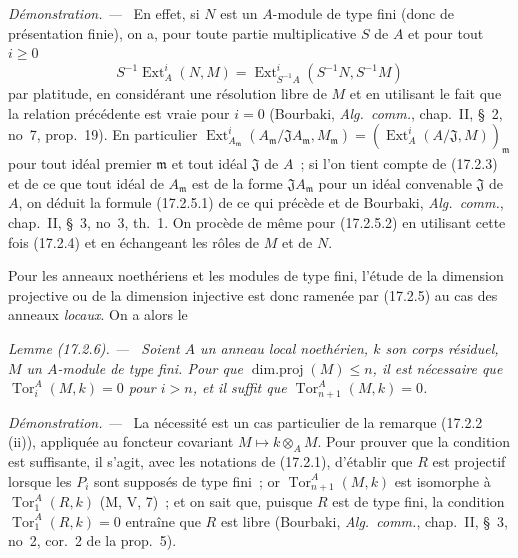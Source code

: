\documentclass[10pt,oneside]{book}
\makeatletter
\newcommand{\setmanualcurrentlabel}[1]{\def\@currentlabel{#1}}
\newcommand{\oldpage}[2][]{%
  \setcounter{footnote}{0}%
  \marginpar{\scriptsize\textbf{#1}~|~#2}\ignorespaces}
\newenvironment{lemma}[1][]{%
  \setmanualcurrentlabel{#1}\par\medskip\noindent\itshape Lemme (#1). ---\ }{\par}
\newenvironment{proof}{%
  \par\medskip\noindent\textit{Démonstration. ---\ }}{\par}
\makeatother
\begin{document}
\begin{proof}
En effet, si $N$ est un $A$-module de type fini (donc de présentation finie),
on a, pour toute partie multiplicative $S$ de $A$ et pour tout $i\geq0$
\[
  S^{-1}\operatorname{Ext}^i_A(N,M)
  =\operatorname{Ext}^i_{S^{-1}A}(S^{-1}N,S^{-1}M)
\]
par platitude, en considérant une résolution libre de $M$ et en utilisant le
fait que la relation précédente est vraie pour $i=0$ (Bourbaki,
\emph{Alg.~comm.}, chap.~II, \S~2, no~7, prop.~19). En particulier
$\operatorname{Ext}^i_{A_{\mathfrak{m}}}
(A_{\mathfrak{m}}/\mathfrak{J}A_{\mathfrak{m}},M_{\mathfrak{m}})
=(\operatorname{Ext}^i_A(A/\mathfrak{J},M))_{\mathfrak{m}}$ pour tout idéal
premier $\mathfrak{m}$ et tout idéal $\mathfrak{J}$ de $A$~; si l'on tient
compte de (17.2.3) et de ce que tout
\oldpage[0\textsubscript{IV-1}]{44}
idéal de $A_{\mathfrak{m}}$ est de la forme $\mathfrak{J}A_{\mathfrak{m}}$
pour un idéal convenable $\mathfrak{J}$ de $A$, on déduit la formule
(17.2.5.1) de ce qui précède et de Bourbaki, \emph{Alg.~comm.}, chap.~II,
\S~3, no~3, th.~1. On procède de même pour (17.2.5.2) en utilisant cette fois
(17.2.4) et en échangeant les rôles de $M$ et de $N$.
\end{proof}

Pour les anneaux noethériens et les modules de type fini, l'étude de la
dimension projective ou de la dimension injective est donc ramenée par
(17.2.5) au cas des anneaux \emph{locaux}. On a alors le

\begin{lemma}[17.2.6]
\label{0.17.2.6-fr}
Soient $A$ un anneau local noethérien, $k$ son corps résiduel, $M$ un
$A$-module de type fini. Pour que $\operatorname{dim.proj}(M)\leq n$, il est
nécessaire que $\operatorname{Tor}^A_i(M,k)=0$ pour $i>n$, et il suffit que
$\operatorname{Tor}^A_{n+1}(M,k)=0$.
\end{lemma}

\begin{proof}
La nécessité est un cas particulier de la remarque (17.2.2 (ii)), appliquée au
foncteur covariant $M\mapsto k\otimes_A M$. Pour prouver que la condition est
suffisante, il s'agit, avec les notations de (17.2.1), d'établir que $R$ est
projectif lorsque les $P_i$ sont supposés de type fini~; or
$\operatorname{Tor}^A_{n+1}(M,k)$ est isomorphe à
$\operatorname{Tor}^A_1(R,k)$ (M, V, 7)~; et on sait que, puisque $R$ est de
type fini, la condition $\operatorname{Tor}^A_1(R,k)=0$ entraîne que $R$ est
libre (Bourbaki, \emph{Alg.~comm.}, chap.~II, \S~3, no~2, cor.~2 de la
prop.~5).
\end{proof}
\end{document}
